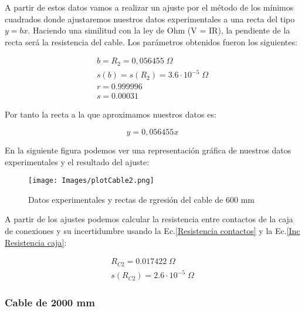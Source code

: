 \documentclass[a4paper,12pt,titlepage]{article}
\begin{document}
A partir de estos datos vamos a realizar un ajuste por el método de los mínimos cuadrados donde ajustaremos nuestros datos experimentales a una recta del tipo $y = bx$. Haciendo una similitud con la ley de Ohm (V = IR), la pendiente de la recta será la resistencia del cable. Los parámetros obtenidos fueron los siguientes:

\begin{equation}
    \begin{gathered}
        b = R_{2} = 0,056455 \; \Omega \\
        s(b) = s(R_{2}) = 3.6 \cdot 10^{-5} \; \Omega \\
        r =  0.999996 \\
        s =  0.00031
    \end{gathered}
\end{equation}

Por tanto la recta a la que aproximamos nuestros datos es:

\begin{equation}
    y = 0,056455x
\end{equation}

En la siguiente figura podemos ver una representación gráfica de nuestros datos experimentales y el resultado del ajuste:

\begin{figure}[h!]
    \centering
    \texttt{[image: Images/plotCable2.png]}
    \caption{Datos experimentales y rectas de rgresión del cable de 600 mm}
\end{figure}

\newpage

A partir de los ajustes podemos calcular la resistencia entre contactos de la caja de conexiones y su incertidumbre usando la Ec.\ref{Resistencia contactos} y la Ec.\ref{Inc Resistencia caja}:

\begin{equation}
    \begin{gathered}
        R_{C2} = 0.017422 \; \Omega\\
        s(R_{C2}) = 2.6 \cdot 10^{-5}\; \Omega
    \end{gathered}
\end{equation}



\subsubsection{Cable de 2000 mm}
\end{document}
